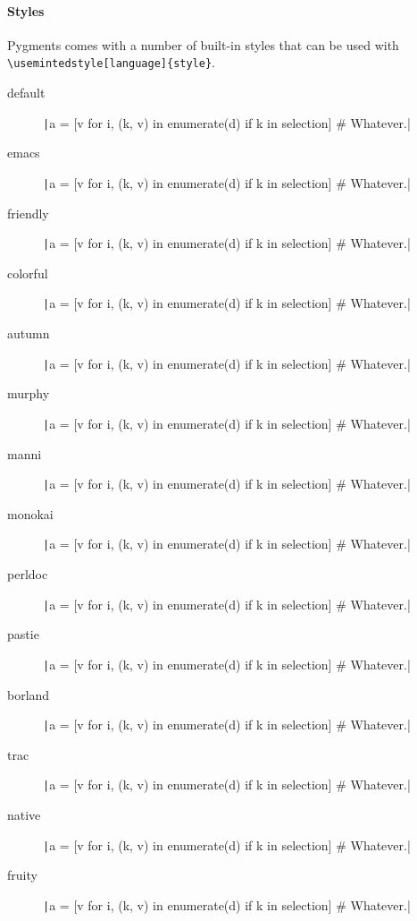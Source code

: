\paragraph{Styles} Pygments comes with a number of built-in styles that can
be used with \verb|\usemintedstyle[language]{style}|.
\begin{description}
  \item[default]  \texttt|a = [v for i, (k, v) in enumerate(d) if k in selection]  # Whatever.|
  \item[emacs]   \texttt|a = [v for i, (k, v) in enumerate(d) if k in selection]  # Whatever.|
  \item[friendly]   \texttt|a = [v for i, (k, v) in enumerate(d) if k in selection]  # Whatever.|
  \item[colorful]   \texttt|a = [v for i, (k, v) in enumerate(d) if k in selection]  # Whatever.|
  \item[autumn]   \texttt|a = [v for i, (k, v) in enumerate(d) if k in selection]  # Whatever.|
  \item[murphy]   \texttt|a = [v for i, (k, v) in enumerate(d) if k in selection]  # Whatever.|
  \item[manni]   \texttt|a = [v for i, (k, v) in enumerate(d) if k in selection]  # Whatever.|
  \item[monokai]   \texttt|a = [v for i, (k, v) in enumerate(d) if k in selection]  # Whatever.|
  \item[perldoc]   \texttt|a = [v for i, (k, v) in enumerate(d) if k in selection]  # Whatever.|
  \item[pastie]   \texttt|a = [v for i, (k, v) in enumerate(d) if k in selection]  # Whatever.|
  \item[borland]   \texttt|a = [v for i, (k, v) in enumerate(d) if k in selection]  # Whatever.|
  \item[trac]   \texttt|a = [v for i, (k, v) in enumerate(d) if k in selection]  # Whatever.|
  \item[native]   \texttt|a = [v for i, (k, v) in enumerate(d) if k in selection]  # Whatever.|
  \item[fruity]   \texttt|a = [v for i, (k, v) in enumerate(d) if k in selection]  # Whatever.|

\end{description}
